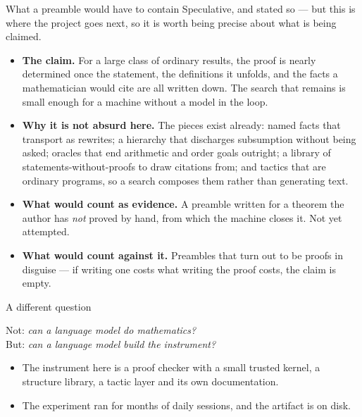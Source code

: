\documentclass[11pt,aspectratio=169]{beamer}
\begin{document}
\begin{frame}{What a preamble would have to contain}
  Speculative, and stated so --- but this is where the project goes next, so it
  is worth being precise about what is being claimed.
  \begin{itemize}
    \item \textbf{The claim.} For a large class of ordinary results, the proof
          is nearly determined once the statement, the definitions it unfolds,
          and the facts a mathematician would cite are all written down. The
          search that remains is small enough for a machine without a model in
          the loop.
    \item \textbf{Why it is not absurd here.} The pieces exist already: named
          facts that transport as rewrites; a hierarchy that discharges
          subsumption without being asked; oracles that end arithmetic and
          order goals outright; a library of statements-without-proofs to draw
          citations from; and tactics that are ordinary programs, so a search
          composes them rather than generating text.
    \item \textbf{What would count as evidence.} A preamble written for a
          theorem the author has \emph{not} proved by hand, from which the
          machine closes it. Not yet attempted.
    \item \textbf{What would count against it.} Preambles that turn out to be
          proofs in disguise --- if writing one costs what writing the proof
          costs, the claim is empty.
  \end{itemize}
\end{frame}

\begin{frame}{A different question}
  \begin{center}
    \Large
    Not: \emph{can a language model do mathematics?}\\[2ex]
    But: \emph{can a language model build the instrument?}
  \end{center}
  \vfill
  \begin{itemize}
    \item The instrument here is a proof checker with a small trusted kernel,
          a structure library, a tactic layer and its own documentation.
    \item The experiment ran for months of daily sessions, and the artifact is
          on disk.
  \end{itemize}
\end{frame}
\end{document}
